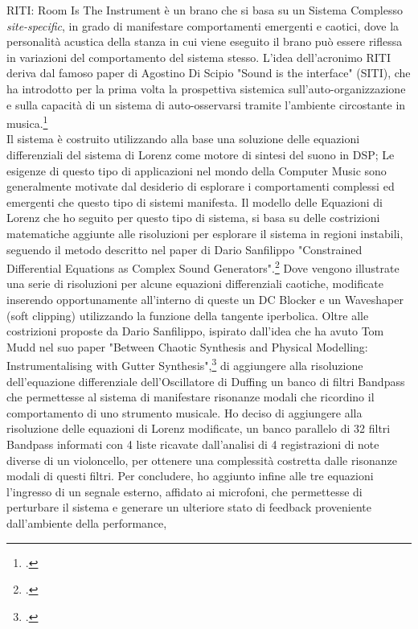 RITI: Room Is The Instrument è un brano che si basa su un Sistema Complesso \textit{site-specific},
in grado di manifestare comportamenti emergenti e caotici,
dove la personalità acustica della stanza in cui viene eseguito il brano può
essere riflessa in variazioni del comportamento del sistema stesso.
L'idea dell'acronimo RITI deriva dal famoso paper di Agostino Di Scipio 
"Sound is the interface" (SITI), 
che ha introdotto per la prima volta la prospettiva sistemica 
sull'auto-organizzazione e sulla capacità di un sistema di auto-osservarsi 
tramite l'ambiente circostante in musica.\footcite{di_scipio_sound_2003} \\
Il sistema è costruito utilizzando alla base una soluzione 
delle equazioni differenziali del sistema di Lorenz come motore di sintesi del suono in DSP;
Le esigenze di questo tipo di applicazioni nel mondo della Computer Music
sono generalmente motivate dal desiderio di esplorare i comportamenti complessi ed emergenti
che questo tipo di sistemi manifesta.
Il modello delle Equazioni di Lorenz che ho seguito per questo tipo di sistema, si basa
su delle costrizioni matematiche aggiunte alle risoluzioni
per esplorare il sistema in regioni instabili, 
seguendo il metodo descritto nel paper di Dario Sanfilippo 
"Constrained Differential Equations as Complex Sound Generators".\footcite{sanfilippo_constrained_2021} 
Dove vengono illustrate una serie di risoluzioni per alcune 
equazioni differenziali caotiche,
modificate inserendo opportunamente all'interno di queste un
DC Blocker e un Waveshaper (soft clipping) utilizzando la funzione della tangente iperbolica.
Oltre alle costrizioni proposte da Dario Sanfilippo, 
ispirato dall'idea che ha avuto Tom Mudd nel suo paper
"Between Chaotic Synthesis and Physical Modelling: Instrumentalising with Gutter Synthesis",\footcite{tom_mudd_gutter_synthesis}
di aggiungere alla risoluzione dell'equazione differenziale dell'Oscillatore di Duffing
un banco di filtri Bandpass che permettesse al sistema di manifestare
risonanze modali che ricordino il comportamento di uno strumento musicale.
Ho deciso di aggiungere alla risoluzione delle equazioni di Lorenz modificate,
un banco parallelo di 32 filtri Bandpass informati 
con 4 liste ricavate dall'analisi di 4 registrazioni di note diverse di un violoncello, 
per ottenere una complessità costretta dalle risonanze modali di questi filtri.
Per concludere, ho aggiunto infine alle tre equazioni l'ingresso di un segnale esterno, 
affidato ai microfoni, 
che permettesse di perturbare il sistema e generare un ulteriore stato 
di feedback proveniente dall'ambiente della performance,
